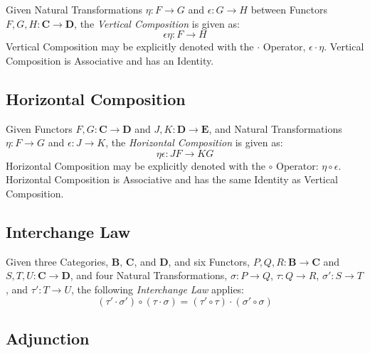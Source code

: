 Given Natural Transformations $\eta : F \rightarrow G$ and $\epsilon :
G \rightarrow H$ between Functors $F,G,H : \mathbf{C} \rightarrow
\mathbf{D}$, the \emph{Vertical Composition} is given as:
\[
  \epsilon \eta : F \rightarrow H
\]
Vertical Composition may be explicitly denoted with the $\cdot$
Operator, $\epsilon \cdot \eta$. Vertical Composition is Associative
and has an Identity.



\subsection{Horizontal Composition}\label{sec:horizontal_composition}

Given Functors $F,G : \mathbf{C} \rightarrow \mathbf{D}$ and $J,K :
\mathbf{D} \rightarrow \mathbf{E}$, and Natural Transformations $\eta
: F \rightarrow G$ and $\epsilon : J \rightarrow K$, the
\emph{Horizontal Composition} is given as:
\[
  \eta \epsilon : JF \rightarrow KG
\]
Horizontal Composition may be explicitly denoted with the $\circ$
Operator: $\eta \circ \epsilon$. Horizontal Composition is Associative
and has the same Identity as Vertical Composition.



\subsection{Interchange Law}\label{sec:interchange_law}

Given three Categories, $\mathbf{B}$, $\mathbf{C}$, and $\mathbf{D}$,
and six Functors, $P,Q,R : \mathbf{B} \rightarrow \mathbf{C}$ and
$S,T,U : \mathbf{C} \rightarrow \mathbf{D}$, and four Natural
Transformations, $\sigma : P \rightarrow Q$, $\tau : Q \rightarrow R$,
$\sigma' : S \rightarrow T$, and $\tau' : T \rightarrow U$, the
following \emph{Interchange Law} applies:
\[
  (\tau' \cdot \sigma') \circ (\tau \cdot \sigma) =
  (\tau' \circ \tau) \cdot (\sigma' \circ \sigma)
\]



\subsection{Adjunction}\label{sec:adjoint}

